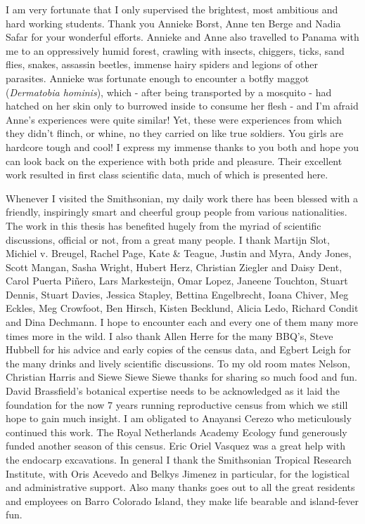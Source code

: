 \documentclass[b5paper,justified]{tufte-book} %
\begin{document}
\begin{fullwidth}
 	I am very fortunate that I only supervised the brightest, most ambitious and hard working students. Thank you Annieke Borst, Anne ten Berge and Nadia Safar for your wonderful efforts. Annieke and Anne also travelled to Panama with me to an oppressively humid forest, crawling with insects, chiggers, ticks, sand flies, snakes, assassin beetles, immense hairy spiders and legions of other parasites. Annieke was fortunate enough to encounter a botfly maggot (\textit{Dermatobia  hominis}), which - after being transported by a mosquito - had hatched on her skin only to burrowed inside to consume her flesh - and I'm afraid Anne's experiences were quite similar! Yet, these were experiences from which they didn't flinch, or whine, no they carried on like true soldiers. You girls are hardcore tough and cool! I express my immense thanks to you both and hope you can look back on the experience with both pride and pleasure. Their excellent work resulted in first class scientific data, much of which is presented here. 
 	
 	
Whenever I visited the Smithsonian, my daily work there has been blessed with a friendly, inspiringly smart and cheerful group people from various nationalities. The work in this thesis has benefited hugely from the myriad of scientific discussions, official or not, from a great many people. I thank Martijn Slot, Michiel v. Breugel, Rachel Page, Kate \& Teague, Justin and Myra, Andy Jones, Scott Mangan, Sasha Wright, Hubert Herz, Christian Ziegler and Daisy Dent, Carol Puerta Pi\~nero, Lars Markesteijn, Omar Lopez, Janeene Touchton, Stuart Dennis, Stuart Davies, Jessica Stapley, Bettina Engelbrecht, Ioana Chiver, Meg Eckles, Meg Crowfoot, Ben Hirsch, Kisten Becklund, Alicia Ledo, Richard Condit and Dina Dechmann.  I hope to encounter each and every one of them many more times more in the wild. I also thank Allen Herre for the many BBQ's, Steve Hubbell for his advice and early copies of the census data, and Egbert Leigh for the many drinks and lively scientific discussions. To my old room mates Nelson, Christian Harris and Siewe Siewe Siewe thanks for sharing so much food and fun. David Brassfield's botanical expertise needs to be acknowledged as it laid the foundation for the now 7 years running reproductive census from which we still hope to gain much insight. I am obligated to Anayansi Cerezo who meticulously continued this work. The Royal Netherlands Academy Ecology fund generously funded another season of this census. Eric Oriel Vasquez was a great help with the endocarp excavations. In general I thank the Smithsonian Tropical Research Institute, with Oris Acevedo and Belkys Jimenez in particular, for the logistical and administrative support. Also many thanks goes out to all the great residents and employees on Barro Colorado Island, they make life bearable and island-fever fun. 


\end{fullwidth}
\end{document}
